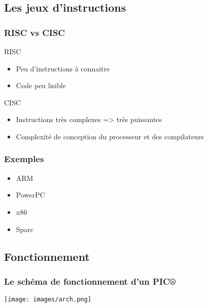 \documentclass[slidetop,11pt]{beamer}
\begin{document}
    \subsection[ISA]{Les jeux d'instructions}
        \begin{frame}
            \frametitle{RISC vs CISC}
            \begin{block}{RISC}
                \begin{itemize}
                    \item Peu d'instructions à connaitre
                    \item Code peu lisible
                \end{itemize}
            \end{block}
            \begin{block}{CISC}
                \begin{itemize}
                    \item Instructions très complexes => très puissantes
                    \item Complexité de conception du processeur et des compilateurs
                \end{itemize}
            \end{block}
        \end{frame}
  
        \begin{frame}
            \frametitle{Exemples}
            \begin{itemize}
                \item ARM
                \item PowerPC
                \item x86
                \item Sparc
            \end{itemize}
        \end{frame}
  
    \subsection[Fonctionnement]{Fonctionnement}
        \begin{frame}
            \frametitle{Le schéma de fonctionnement d'un PIC®}
            \begin{center}
                \texttt{[image: images/arch.png]}
            \end{center}
        \end{frame}
 
\end{document}
